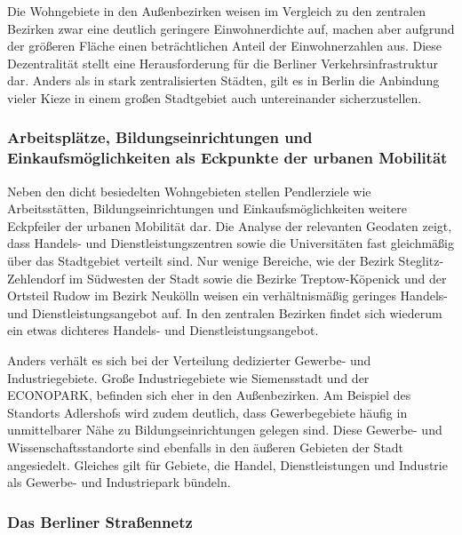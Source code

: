 
Die Wohngebiete in den Außenbezirken weisen im Vergleich zu den zentralen Bezirken zwar eine deutlich geringere Einwohnerdichte auf, machen aber aufgrund der größeren Fläche einen beträchtlichen Anteil der Einwohnerzahlen aus. Diese Dezentralität stellt eine Herausforderung für die Berliner Verkehrsinfrastruktur dar. Anders als in stark zentralisierten Städten, gilt es in Berlin die Anbindung vieler Kieze in einem großen Stadtgebiet auch untereinander sicherzustellen.

\subsubsection{Arbeitsplätze, Bildungseinrichtungen und Einkaufsmöglichkeiten als Eckpunkte der urbanen Mobilität}

Neben den dicht besiedelten Wohngebieten stellen Pendlerziele wie Arbeitsstätten, Bildungseinrichtungen und Einkaufsmöglichkeiten weitere Eckpfeiler der urbanen Mobilität dar. Die Analyse der relevanten Geodaten zeigt, dass Handels- und Dienstleistungszentren sowie die Universitäten fast gleichmäßig über das Stadtgebiet verteilt sind. Nur wenige Bereiche, wie der Bezirk Steglitz-Zehlendorf im Südwesten der Stadt sowie die Bezirke Treptow-Köpenick und der Ortsteil Rudow im Bezirk Neukölln weisen ein verhältnismäßig geringes Handels- und Dienstleistungsangebot auf. In den zentralen Bezirken findet sich wiederum ein etwas dichteres Handels- und Dienstleistungsangebot.

Anders verhält es sich bei der Verteilung dedizierter Gewerbe- und Industriegebiete. Große Industriegebiete wie Siemensstadt und der ECONOPARK, befinden sich eher in den Außenbezirken. Am Beispiel des Standorts Adlershofs wird zudem deutlich, dass Gewerbegebiete häufig in unmittelbarer Nähe zu Bildungseinrichtungen gelegen sind. Diese Gewerbe- und Wissenschaftsstandorte sind ebenfalls in den äußeren Gebieten der Stadt angesiedelt. Gleiches gilt für Gebiete, die Handel, Dienstleistungen und Industrie als Gewerbe- und Industriepark bündeln.


\subsubsection{Das Berliner Straßennetz}


